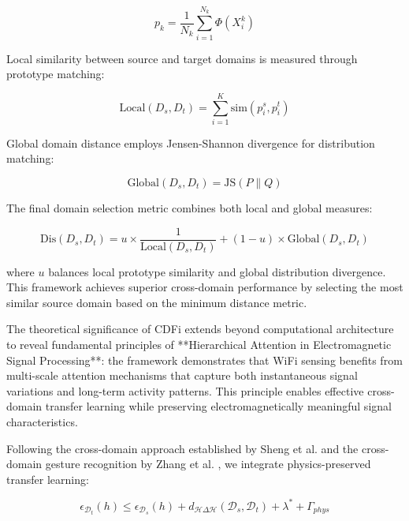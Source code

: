 \documentclass[journal]{IEEEtran}
\begin{document}
\begin{equation}
p_k = \frac{1}{N_k} \sum_{i=1}^{N_k} \Phi(X_i^k)
\label{eq:cdfi_prototype}
\end{equation}

Local similarity between source and target domains is measured through prototype matching:

\begin{equation}
\text{Local}(D_s, D_t) = \sum_{i=1}^{K} \text{sim}(p_i^s, p_i^t)
\label{eq:cdfi_local_similarity}
\end{equation}

Global domain distance employs Jensen-Shannon divergence for distribution matching:

\begin{equation}
\text{Global}(D_s, D_t) = \text{JS}(P \| Q)
\label{eq:cdfi_global_distance}
\end{equation}

The final domain selection metric combines both local and global measures:

\begin{equation}
\text{Dis}(D_s, D_t) = u \times \frac{1}{\text{Local}(D_s, D_t)} + (1-u) \times \text{Global}(D_s, D_t)
\label{eq:cdfi_domain_distance}
\end{equation}

where $u$ balances local prototype similarity and global distribution divergence. This framework achieves superior cross-domain performance by selecting the most similar source domain based on the minimum distance metric.

The theoretical significance of CDFi extends beyond computational architecture to reveal fundamental principles of **Hierarchical Attention in Electromagnetic Signal Processing**: the framework demonstrates that WiFi sensing benefits from multi-scale attention mechanisms that capture both instantaneous signal variations and long-term activity patterns. This principle enables effective cross-domain transfer learning while preserving electromagnetically meaningful signal characteristics.

Following the cross-domain approach established by Sheng et al. \cite{sheng2024cdfi} and the cross-domain gesture recognition by Zhang et al. \cite{zhang2021wifi}, we integrate physics-preserved transfer learning:

\begin{equation}
\epsilon_{\mathcal{D}_t}(h) \leq \epsilon_{\mathcal{D}_s}(h) + d_{\mathcal{H}\Delta\mathcal{H}}(\mathcal{D}_s, \mathcal{D}_t) + \lambda^* + \Gamma_{phys}
\label{eq:domain_bound_physics}
\end{equation}
\end{document}
